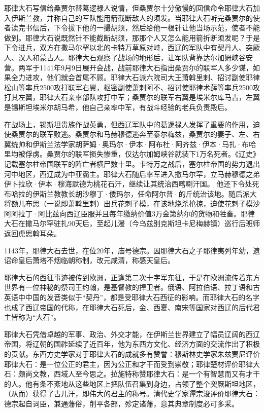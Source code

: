 耶律大石写信给桑贾尔替葛逻禄人说情，但桑贾尔十分傲慢的回信命令耶律大石加入伊斯兰教，并称自己的军队能用箭截断敌人的须发。当耶律大石听完桑贾尔的使者读完书信后，下令拔下他的一撮胡须，然后给他一根针让他当场示范，使者不能做到。耶律大石说既然针不能截断胡须，那那个人又怎么能用箭折断须发呢？于是下令进兵，双方在撒马尔罕以北的卡特万草原对峙，西辽的军队中有契丹人、突厥人、汉人和蒙古人。耶律大石观察了战场的地形后，让军队背靠达尔加姆峡谷安营。两军于1141年9月9日展开会战，战前耶律大石指出桑贾尔的联军人多少谋，如果全力进攻，他们就会首尾不顾。耶律大石派六院司大王萧斡里剌、招讨副使耶律松山等率兵2500攻打联军右翼，枢密副使萧剌阿不、招讨使耶律术薛等率兵2500攻打其左翼，耶律大石亲率部队攻打中军；桑贾尔的联军右翼是埃米尔库马吉，左翼是锡斯坦埃米尔胡马希，他自己亲率中军，有战斗经验的老兵负责殿后。

在战场上，锡斯坦贵族作战英勇，但西辽军队中的葛逻禄人发挥了重要的作用，迫使桑贾尔的联军败逃。桑贾尔和马赫穆德逃奔至泰尔梅兹，桑贾尔的妻子、左、右翼统帅和伊斯兰法学家胡萨姆·奥玛尔·伊本·阿布杜·阿齐兹·伊本·马扎·布哈里均被俘虏。桑贾尔的联军损失惨重，仅达尔加姆峡谷就装下1万名死者。《辽史》记载塞尔柱帝国联军的阵亡者横尸数十里。卡特万之战后，塞尔柱帝国的势力退出河中地区，西辽成为中亚霸主。耶律大石随后率军进入撒马尔罕，立马赫穆德之弟伊卜拉欣·伊本·穆海默德为桃花石汗，继续让其统治西喀喇汗国。 他还下令处死布哈拉的伊斯兰教教长胡沙穆丁·倭玛尔，任命阿尔普·的斤统治该地。随后派大将额儿布思（一说即萧斡里剌）出兵花剌子模，在该地烧杀抢掠，迫使花剌子模沙阿阿拉丁·阿比兹向西辽臣服并且每年缴纳价值3万金第纳尔的货物和牲畜。耶律大石在撒马尔罕驻扎90天后，至起儿漫（今乌兹别克斯坦卡尼梅赫镇）巡行后班师返回虎思斡耳朵。

1143年，耶律大石去世，在位20年，庙号德宗。因耶律大石之子耶律夷列年幼，遗诏命皇后萧塔不烟临朝称制，改元咸清，称感天皇后。

耶律大石的西征事迹被传到欧洲，正逢第二次十字军东征，于是在欧洲流传着东方世界有一位神秘的祭司王约翰，是基督教的捍卫者。俄语、阿拉伯语、拉丁语和古英语中中国的发音类似于“契丹”，都是受耶律大石西征的影响。而耶律大石的名字也成了西辽帝国的代称，在耶律大石死后，金、西夏、南宋等国家对西辽的后代君主皆称为“大石”。

耶律大石凭借卓越的军事、政治、外交才能，在伊斯兰世界建立了幅员辽阔的西辽帝国，将辽朝的国祚延续了近百年，他为东西方文化、经济方面的交流作出了积极的贡献。东西方史学家对于耶律大石的成就多有赞誉：穆斯林史学家朱兹贾尼评价耶律大石：是一位公正的君主，因为公正和才干而受到崇敬；耶律楚材评价耶律大石：颇尚文教，西域人至今思之。拉施特称赞耶律大石：是一个有智慧而又有才干的人。他有条不紊地从这些地区上把队伍召集到身边，占领了整个突厥斯坦地区，（从而）获得了古儿汗，即伟大的君主的称号。清代史学家谭宗浚评价耶律大石：德宗起自词臣，兼通藩俗，削平各部，殄定诸藩，意其典章制度必可多采。

